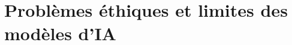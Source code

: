 \chapter{Problèmes éthiques et limites des modèles d’IA}
    \section{}
        \subsection{}
            \subsubsection{}